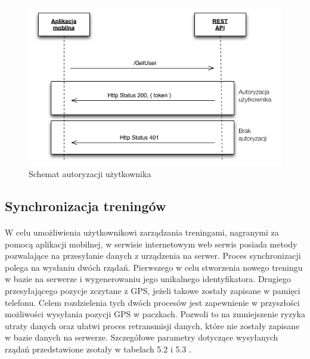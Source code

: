 \begin{figure}[ht]
	\centering
		\includegraphics[width=1\linewidth]{assets/auth_schema.png}
		\caption{Schemat autoryzacji użytkownika}
	\label{fig:auth_schema}
\end{figure}

\newpage

\subsection{Synchronizacja treningów} %
\label{sub:synchronizacja_trening_w}
\paragraph{} %
\label{par:}
W celu umożliwienia użytkownikowi zarządzania treningami, nagranymi za pomocą aplikacji mobilnej, w serwisie internetowym web serwis posiada metody pozwalające na przesyłanie danych z urządzenia na serwer. Proces synchronizacji polega na wysłaniu dwóch rządań. Pierwszego w celu stworzenia nowego treningu w bazie na serwerze i wygenerowaniu jego unikalnego identyfikatora. Drugiego przesyłającego pozycje zczytane z GPS, jeżeli takowe zostały zapisane w pamięci telefonu. Celem rozdzielenia tych dwóch procesów jest zapewnienie w przyszłości możliwości wysyłania pozycji GPS w paczkach. Pozwoli to na zmniejszenie ryzyka utraty danych oraz ułatwi proces retransmisji danych, które nie zostały zapisane w bazie danych na serwerze. Szczegółowe parametry dotyczące wysyłanych rządań przedstawione zsotały w tabelach 5.2 i 5.3 .

